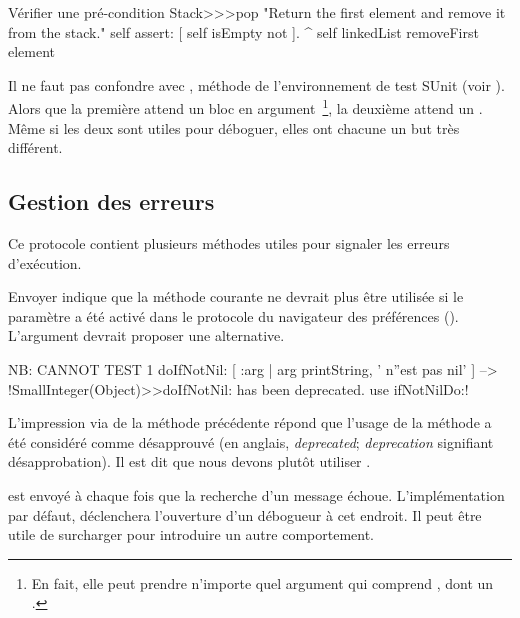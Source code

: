 \documentclass[a4paper,10pt,twoside]{book}
\begin{document}
\begin{method}{Vérifier une pré-condition}
Stack>>>pop
    "Return the first element and remove it from the stack."
    self assert: [ self isEmpty not ].
    ^ self linkedList removeFirst element
\end{method}

Il ne faut pas confondre  avec , 
méthode de l'environnement de test SUnit (voir ). Alors que la 
première attend un bloc en argument~\footnote{En fait, elle peut prendre n'importe quel argument qui comprend , dont un .}, la deuxième attend un . Même si les deux sont utiles pour déboguer, 
elles ont chacune un but très différent.

\subsection{Gestion des erreurs}

Ce protocole contient plusieurs méthodes utiles pour signaler les erreurs d'exécution.

Envoyer  indique que la méthode courante ne devrait plus être utilisée si le paramètre  a été activé dans le protocole  du navigateur des préférences ().
L'argument  devrait proposer une alternative.

\begin{code}{NB: CANNOT TEST}
1 doIfNotNil: [ :arg | arg printString, ' n''est pas nil' ]
	--> !SmallInteger(Object)>>doIfNotNil: has been deprecated. use ifNotNilDo:!
\end{code}

L'impression via  de la méthode précédente
répond que l'usage de la méthode  a
été considéré comme désapprouvé (en anglais,
\emph{deprecated}; \emph{deprecation} signifiant désapprobation). Il
est dit que nous devons plutôt utiliser .

 est envoyé à chaque fois que la recherche d'un message échoue. L'implémentation par défaut, \ie {} déclenchera l'ouverture d'un débogueur à cet endroit. Il peut être utile de surcharger  pour introduire un autre comportement.
\end{document}
